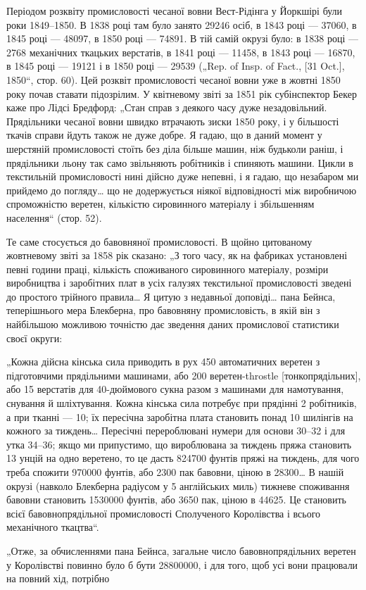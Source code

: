 
Періодом розквіту промисловості чесаної вовни Вест-Рідінга
у Йоркшірі були роки 1849--1850. В 1838 році там було занято
\num{29246} осіб, в 1843 році — \num{37060}, в 1845 році — \num{48097}, в 1850 році —
\num{74891}. В тій самій окрузі було: в 1838 році — 2768 механічних
ткацьких верстатів, в 1841 році — \num{11458}, в 1843 році — \num{16870},
в 1845 році — \num{19121} і в 1850 році — \num{29539} („Rep. of Insp. of Fact.,
[31 Oct.], 1850“, стор. 60). Цей розквіт промисловості чесаної
вовни уже в жовтні 1850 року почав ставати підозрілим. У квітневому
звіті за 1851 рік субінспектор Бекер каже про Лідсі Бредфорд:
„Стан справ з деякого часу дуже незадовільний. Прядільники
чесаної вовни швидко втрачають зиски 1850 року, і у більшості
ткачів справи йдуть також не дуже добре. Я гадаю, що
в даний момент у шерстяній промисловості стоїть без діла більше
машин, ніж будьколи раніш, і прядільники льону так само звільняють
робітників і спиняють машини. Цикли в текстильній промисловості
нині дійсно дуже непевні, і я гадаю, що незабаром
ми прийдемо до погляду\dots{} що не додержується ніякої відповідності
між виробничою спроможністю веретен, кількістю сировинного
матеріалу і збільшенням населення“ (стор. 52).

Те саме стосується до бавовняної промисловості. В щойно
цитованому жовтневому звіті за 1858 рік сказано: „З того часу,
як на фабриках установлені певні години праці, кількість споживаного
сировинного матеріалу, розміри виробництва і заробітних
плат в усіх галузях текстильної промисловості зведені
до простого трійного правила\dots{} Я цитую з недавньої доповіді\dots{}
пана Бейнса, теперішнього мера Блекберна, про бавовняну промисловість,
в якій він з найбільшою можливою точністю дає
зведення даних промислової статистики своєї округи:

„Кожна дійсна кінська сила приводить в рух 450 автоматичних
веретен з підготовчими прядільними машинами, або 200 веретен-throstle
[тонкопрядільних], або 15 верстатів для 40-дюймового
сукна разом з машинами для намотування, снування й
шліхтування. Кожна кінська сила потребує при прядінні 2 робітників,
а при тканні — 10; їх пересічна заробітна плата становить
понад 10  шилінгів на кожного за тиждень\dots{} Пересічні
перероблювані нумери для основи 30--32 і для утка 34--36;
якщо ми припустимо, що вироблювана за тиждень пряжа становить
13 унцій на одно веретено, то це дасть \num{824700} фунтів
пряжі на тиждень, для чого треба спожити \num{970000} фунтів, або
2300 пак бавовни, ціною в \num{28300}\dots{} В нашій
окрузі (навколо Блекберна радіусом у 5 англійських миль)
тижневе споживання бавовни становить \num{1530000} фунтів, або
3650 пак, ціною в \num{44625}. Це становить 
всієї бавовнопрядільної промисловості Сполученого Королівства
і   всього механічного ткацтва“.

„Отже, за обчисленнями пана Бейнса, загальне число бавовнопрядільних
веретен у Королівстві повинно було б бути \num{28800000},
і для того, щоб усі вони працювали на повний хід, потрібно
\parbreak{}  %
